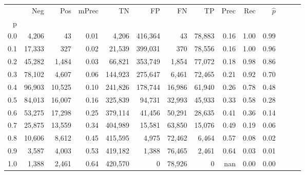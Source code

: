 \begin{tabular}{rrrrrrrrrrrrrr}
\toprule
{} &     Neg &     Pos & mPrec &       TN &       FP &      FN &      TP &  Prec &   Rec & $\hat{p}$ \\
p   &         &         &       &          &          &         &         &       &       &           \\
\midrule
0.0 &   4,206 &      43 &  0.01 &    4,206 &  416,364 &      43 &  78,883 &  0.16 &  1.00 &      0.99 \\
0.1 &  17,333 &     327 &  0.02 &   21,539 &  399,031 &     370 &  78,556 &  0.16 &  1.00 &      0.96 \\
0.2 &  45,282 &   1,484 &  0.03 &   66,821 &  353,749 &   1,854 &  77,072 &  0.18 &  0.98 &      0.86 \\
0.3 &  78,102 &   4,607 &  0.06 &  144,923 &  275,647 &   6,461 &  72,465 &  0.21 &  0.92 &      0.70 \\
0.4 &  96,903 &  10,525 &  0.10 &  241,826 &  178,744 &  16,986 &  61,940 &  0.26 &  0.78 &      0.48 \\
0.5 &  84,013 &  16,007 &  0.16 &  325,839 &   94,731 &  32,993 &  45,933 &  0.33 &  0.58 &      0.28 \\
0.6 &  53,275 &  17,298 &  0.25 &  379,114 &   41,456 &  50,291 &  28,635 &  0.41 &  0.36 &      0.14 \\
0.7 &  25,875 &  13,559 &  0.34 &  404,989 &   15,581 &  63,850 &  15,076 &  0.49 &  0.19 &      0.06 \\
0.8 &  10,606 &   8,612 &  0.45 &  415,595 &    4,975 &  72,462 &   6,464 &  0.57 &  0.08 &      0.02 \\
0.9 &   3,587 &   4,003 &  0.53 &  419,182 &    1,388 &  76,465 &   2,461 &  0.64 &  0.03 &      0.01 \\
1.0 &   1,388 &   2,461 &  0.64 &  420,570 &        0 &  78,926 &       0 &   nan &  0.00 &      0.00 \\
\bottomrule
\end{tabular}
